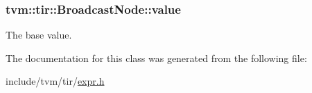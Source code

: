 \subsubsection[{\texorpdfstring{value}{value}}]{ tvm\+::tir\+::\+Broadcast\+Node\+::value}\hypertarget{classtvm_1_1tir_1_1BroadcastNode_ac57a290b1c990251951305769d340bdd}{}\label{classtvm_1_1tir_1_1BroadcastNode_ac57a290b1c990251951305769d340bdd}


The base value. 



The documentation for this class was generated from the following file\+:\begin{DoxyCompactItemize}
\item 
include/tvm/tir/\hyperlink{tir_2expr_8h}{expr.\+h}\end{DoxyCompactItemize}

